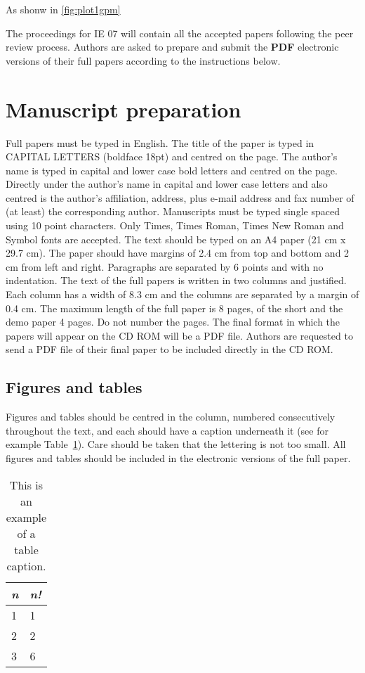 \documentclass{article}
\begin{document}
As shonw in \autoref{fig:plot1gpm}

The proceedings for IE 07 will contain all the accepted
papers following the peer review process. Authors are
asked to prepare and submit the {\bf PDF} electronic versions
of their full papers according to the instructions below.

\section{Manuscript preparation}
Full papers must be typed in English. The title of the
paper is typed in CAPITAL LETTERS (boldface 18pt)
and centred on the page. The author's name is typed in
capital and lower case bold letters and centred on the
page. Directly under the author's name in capital and
lower case letters and also centred is the author's
affiliation, address, plus e-mail address and fax number of
(at least) the corresponding author. Manuscripts must be
typed single spaced using 10 point characters. Only
Times, Times Roman, Times New Roman and Symbol
fonts are accepted. The text should be typed on an A4
paper (21 cm x 29.7 cm). The paper should have margins
of 2.4 cm from top and bottom and 2 cm from left and
right. Paragraphs are separated by 6 points and with no
indentation. The text of the full papers is written in two
columns and justified. Each column has a width of 8.3 cm
and the columns are separated by a margin of 0.4 cm. The
maximum length of the full paper is 8 pages, of the short
and the demo paper 4 pages. Do not number the pages.
The final format in which the papers will appear on the
CD ROM will be a PDF file. Authors are requested to send
a PDF file of their final paper to be included directly
in the CD ROM.

\subsection{Figures and tables}
Figures and tables should be centred in the column,
numbered consecutively throughout the text, and each
should have a caption underneath it (see for example
Table~\ref{tab1}). Care should be taken that the lettering
is not too small. All figures and tables should be included
in the electronic versions of the full paper.


\begin{table}[htb!]
\begin{center}

\begin{tabular}{|l|l|}
\hline
{\em n} & {\em n!} \\
\hline
1 & 1  \\
2 & 2  \\
3  & 6\\
\hline
\end{tabular}
\end{center}
\caption{\label{tab1}This is an example of a table caption.}
\end{table}
\end{document}
